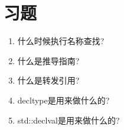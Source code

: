 \section{习题}
\begin{enumerate}
\item
什么时候执行名称查找?

\item
什么是推导指南?

\item
什么是转发引用?

\item
decltype是用来做什么的?

\item
std::declval是用来做什么的?
\end{enumerate}